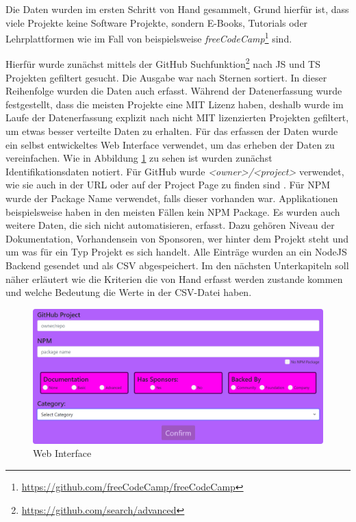 
Die Daten wurden im ersten Schritt von Hand gesammelt, Grund hierfür ist, dass viele Projekte keine
Software Projekte, sondern E-Books, Tutorials oder Lehrplattformen wie im Fall von beispielsweise
\textit{freeCodeCamp}\footnote{\url{https://github.com/freeCodeCamp/freeCodeCamp}} sind.

Hierfür wurde zunächst mittels der GitHub Suchfunktion\footnote{\url{https://github.com/search/advanced}}
nach JS und TS Projekten gefiltert gesucht. Die Ausgabe war nach Sternen sortiert. In dieser Reihenfolge
wurden die Daten auch erfasst.
Während der Datenerfassung wurde festgestellt, dass die meisten Projekte eine MIT Lizenz haben,
deshalb wurde im Laufe der Datenerfassung explizit nach nicht MIT lizenzierten Projekten gefiltert,
um etwas besser verteilte Daten zu erhalten.
Für das erfassen der Daten wurde ein selbst entwickeltes Web Interface verwendet, um das erheben der
Daten zu vereinfachen. Wie in Abbildung \ref{abb:Web_Interface} zu sehen ist wurden zunächst
Identifikationsdaten notiert. Für GitHub wurde \textit{<owner>/<project>} verwendet,
wie sie auch in der URL oder auf der Project Page zu finden sind . Für NPM wurde der
Package Name verwendet, falls dieser vorhanden war. Applikationen beispielsweise haben in den meisten
Fällen kein NPM Package.
Es wurden auch weitere Daten, die sich nicht automatisieren, erfasst. Dazu gehören Niveau der
Dokumentation, Vorhandensein von Sponsoren, wer hinter dem Projekt steht und um was für ein Typ Projekt
es sich handelt.
Alle Einträge wurden an ein NodeJS Backend gesendet und als CSV abgespeichert.
Im den nächsten Unterkapiteln soll näher erläutert wie die Kriterien die von Hand erfasst werden zustande
kommen und welche Bedeutung die Werte in der CSV-Datei haben.


\begin{figure}[]
    \centering
    \includegraphics[scale=0.25]{figures/04/WebInterface.png}
    \caption{Web Interface}
    \label{abb:Web_Interface}
\end{figure}




